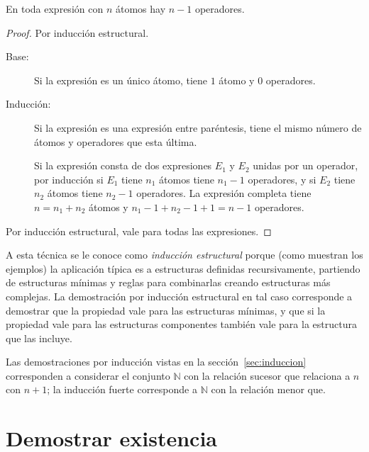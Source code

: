   \begin{theorem}
    \label{theo:operandos-operadores}
    En toda expresión con \(n\) átomos hay \(n - 1\) operadores.
  \end{theorem}
  \begin{proof}
    Por inducción estructural.
    \begin{description}
    \item[Base:]
      Si la expresión es un único átomo,
      tiene \(1\) átomo y \(0\) operadores.
    \item[Inducción:]
      Si la expresión es una expresión entre paréntesis,
      tiene el mismo número de átomos y operadores que esta última.

      Si la expresión consta de dos expresiones \(E_1\) y \(E_2\)
      unidas por un operador,
      por inducción si \(E_1\) tiene \(n_1\) átomos
      tiene \(n_1 - 1\) operadores,
      y si \(E_2\) tiene \(n_2\) átomos
      tiene \(n_2 - 1\) operadores.
      La expresión completa tiene \(n = n_1 + n_2\) átomos
      y \(n_1 - 1 + n_2 - 1 + 1 = n - 1\) operadores.
    \end{description}
    Por inducción estructural,
    vale para todas las expresiones.
  \end{proof}

  A esta técnica se le conoce como \emph{inducción estructural}
  porque
  (como muestran los ejemplos)
  la aplicación típica es a estructuras definidas recursivamente,
  partiendo de estructuras mínimas y reglas para combinarlas
  creando estructuras más complejas.
  La demostración por inducción estructural en tal caso
  corresponde a demostrar
  que la propiedad vale para las estructuras mínimas,
  y que si la propiedad vale para las estructuras componentes
  también vale para la estructura que las incluye.

  Las demostraciones por inducción
  vistas en la sección~\ref{sec:induccion}
  corresponden a considerar el conjunto \(\mathbb{N}\)
  con la relación sucesor
  que relaciona a \(n\) con \(n + 1\);
  la inducción fuerte
  corresponde a \(\mathbb{N}\) con la relación menor que.

\section{Demostrar existencia}
\label{sec:existencia}

